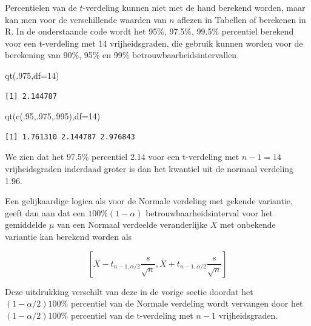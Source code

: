 \documentclass[
  dutch,
  letterpaper,
  12pt]{book}
\newenvironment{Shaded}{\begin{snugshade}}{\end{snugshade}}
\newcommand{\AttributeTok}[1]{\textcolor[rgb]{0.40,0.45,0.13}{#1}}
\newcommand{\DecValTok}[1]{\textcolor[rgb]{0.68,0.00,0.00}{#1}}
\newcommand{\FunctionTok}[1]{\textcolor[rgb]{0.28,0.35,0.67}{#1}}
\newcommand{\NormalTok}[1]{\textcolor[rgb]{0.00,0.23,0.31}{#1}}
\theoremstyle{definition}
\theoremstyle{definition}
\theoremstyle{definition}
\theoremstyle{remark}
\begin{document}
Percentielen van de \(t\)-verdeling kunnen niet met de hand berekend
worden, maar kan men voor de verschillende waarden van \(n\) aflezen in
Tabellen of berekenen in R. In de onderstaande code wordt het 95\%,
97.5\%, 99.5\% percentiel berekend voor een t-verdeling met 14
vrijheidsgraden, die gebruik kunnen worden voor de berekening van 90\%,
95\% en 99\% betrouwbaarheidsintervallen.

\begin{Shaded}
\begin{Highlighting}[]
\FunctionTok{qt}\NormalTok{(.}\DecValTok{975}\NormalTok{,}\AttributeTok{df=}\DecValTok{14}\NormalTok{)}
\end{Highlighting}
\end{Shaded}

\begin{verbatim}
[1] 2.144787
\end{verbatim}

\begin{Shaded}
\begin{Highlighting}[]
\FunctionTok{qt}\NormalTok{(}\FunctionTok{c}\NormalTok{(.}\DecValTok{95}\NormalTok{,.}\DecValTok{975}\NormalTok{,.}\DecValTok{995}\NormalTok{),}\AttributeTok{df=}\DecValTok{14}\NormalTok{)}
\end{Highlighting}
\end{Shaded}

\begin{verbatim}
[1] 1.761310 2.144787 2.976843
\end{verbatim}

We zien dat het 97.5\% percentiel 2.14 voor een t-verdeling met
\(n-1=14\) vrijheidsgraden inderdaad groter is dan het kwantiel uit de
normaal verdeling 1.96.

Een gelijkaardige logica als voor de Normale verdeling met gekende
variantie, geeft dan aan dat een \(100\% (1-\alpha)\)
betrouwbaarheidsinterval voor het gemiddelde \(\mu\) van een Normaal
verdeelde veranderlijke \(X\) met onbekende variantie kan berekend
worden als

\begin{equation*}
\left[\bar{X} - t_{n-1, \alpha/2} \frac{s}{\sqrt{n}} , \bar{X} + t_{n-1,
\alpha/2} \frac{s}{\sqrt{n}}\right]
\end{equation*}

Deze uitdrukking verschilt van deze in de vorige sectie doordat het
\((1-\alpha/2)100\%\) percentiel van de Normale verdeling wordt
vervangen door het \((1-\alpha/2)100\%\) percentiel van de t-verdeling
met \(n-1\) vrijheidsgraden.
\end{document}
